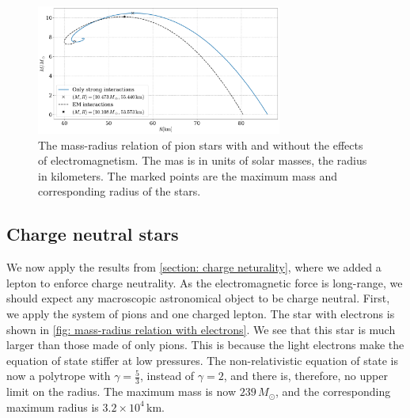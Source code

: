 

\begin{figure}[!htb]
    \centering
    \includegraphics[width=0.72\textwidth]{../scripts/figurer/pion_star/mass_radius_pion_star_compare.pdf}
    \caption{
        The mass-radius relation of pion stars with and without the effects of electromagnetism.
        The mas is in units of solar masses, the radius in kilometers.
        The marked points are the maximum mass and corresponding radius of the stars.
        }
        \label{fig: mass-radius relation comparison}
\end{figure}



\FloatBarrier
\subsection{Charge neutral stars}


We now apply the results from \autoref{section: charge neturality}, where we added a lepton to enforce charge neutrality.
As the electromagnetic force is long-range, we should expect any macroscopic astronomical object to be charge neutral.
First, we apply the system of pions and one charged lepton.
The star with electrons is shown in \autoref{fig: mass-radius relation with electrons}.
We see that this star is much larger than those made of only pions.
This is because the light electrons make the equation of state stiffer at low pressures.
The non-relativistic equation of state is now a polytrope with $\gamma = \frac{5}{3}$, instead of $\gamma = 2$, and there is, therefore, no upper limit on the radius.
The maximum mass is now $239\, M_\odot $, and the corresponding maximum radius is $ 3.2\times10^4\,\text{km}$.

